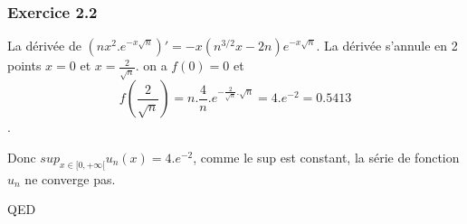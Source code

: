 \documentclass[]{book}
\theoremstyle{definition}
\begin{document}
\subsubsection*{Exercice 2.2}
La d\'eriv\'ee de $\left(nx^2.e^{-x\sqrt{n}}\right)' = -x(n^{3/2}x-2n)e^{-x\sqrt{n}}$. La d\'eriv\'ee s'annule en 2 points $x=0$ et $x=\frac{2}{\sqrt{n}}$.
on a $f(0) = 0$ et 
$$f(\frac{2}{\sqrt{n}}) = n.\frac{4}{n}.e^{-\frac{2}{\sqrt{n}}.\sqrt{n}} = 4.e^{-2} = 0.5413$$. 

Donc $sup_{x\in[0,+\infty[}u_n(x) = 4.e^{-2}$, comme le sup est constant, la s\'erie de fonction $u_n$ ne converge pas.


QED
\end{document}
